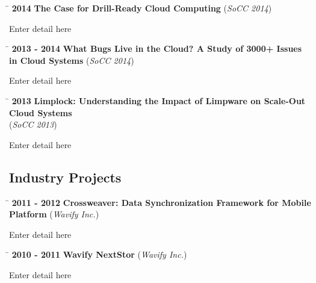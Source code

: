 \documentclass[10pt]{article} %
\begin{document}
\begin{tabbing}
\hspace{2.5cm} \= \kill
\textbf{2014} \>\+ \textbf{The Case for Drill-Ready Cloud Computing} (\textit{SoCC 2014}) \\
\begin{minipage}{\smallertextwidth}
Enter detail here
\end{minipage}
\end{tabbing}

\begin{tabbing}
\hspace{2.5cm} \= \kill
\textbf{2013 - 2014} \>\+ \textbf{What Bugs Live in the Cloud? A Study of 3000+ Issues in Cloud Systems} (\textit{SoCC 2014}) \\
\begin{minipage}{\smallertextwidth}
Enter detail here
\end{minipage}
\end{tabbing}

\begin{tabbing}
\hspace{2.5cm} \= \kill
\textbf{2013} \> \textbf{Limplock: Understanding the Impact of Limpware on Scale-Out Cloud Systems} \\
\>\+ (\textit{SoCC 2013}) \\
\begin{minipage}{\smallertextwidth}
Enter detail here
\end{minipage}
\end{tabbing}

\subsection{Industry Projects}

\begin{tabbing}
\hspace{2.5cm} \= \kill
\textbf{2011 - 2012} \>\+ \textbf{Crossweaver: Data Synchronization Framework for Mobile Platform} (\textit{Wavify Inc.}) \\
\begin{minipage}{\smallertextwidth}
Enter detail here
\end{minipage}
\end{tabbing}

\begin{tabbing}
\hspace{2.5cm} \= \kill
\textbf{2010 - 2011} \>\+ \textbf{Wavify NextStor} (\textit{Wavify Inc.}) \\
\begin{minipage}{\smallertextwidth}
Enter detail here
\end{minipage}
\end{tabbing}
\end{document}
